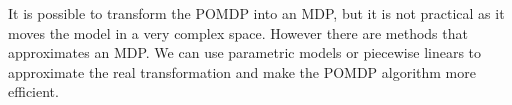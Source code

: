 It is possible to transform the POMDP into an MDP, but it is not practical as it moves the model in a very complex space. However there are methods that approximates an MDP. We can use parametric models or piecewise linears to approximate the real transformation and make the POMDP algorithm more efficient.







